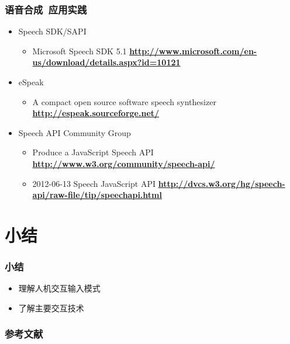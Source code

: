 \documentclass{beamer}
\newcommand{\fullPageImage}[2]{
	{
		\usebackgroundtemplate{\texttt{[image: \#1]}}
		\frame[plain]{#2}
	}
}
\begin{document}
\begin{frame}
	\frametitle{语音合成~{\small 应用实践}}
	\beamertemplatetransparentcovereddynamicmedium
	\begin{itemize}
		\item Speech SDK/SAPI
		\begin{itemize}
			\item Microsoft Speech SDK 5.1 \textbf{\url{http://www.microsoft.com/en-us/download/details.aspx?id=10121}}
		\end{itemize}
		\pause
		\item eSpeak
		\begin{itemize}
			\item A compact open source software speech synthesizer \textbf{\url{http://espeak.sourceforge.net/}}
		\end{itemize}
		\pause
		\item Speech API Community Group
		\begin{itemize}
			\item Produce a JavaScript Speech API \textbf{\url{http://www.w3.org/community/speech-api/}}
			\item 2012-06-13 Speech JavaScript API \textbf{\url{http://dvcs.w3.org/hg/speech-api/raw-file/tip/speechapi.html}}
		\end{itemize}
	\end{itemize}
\end{frame}

\fullPageImage{images/linux-espeak.jpg}{\transwipe}

%

\section{小结}
\begin{frame}
	\frametitle{小结}
	\begin{itemize}
		\item 理解人机交互输入模式
		\item 了解主要交互技术
	\end{itemize}
\end{frame}
 
\begin{frame}
	\frametitle{参考文献}
	
	
\end{frame}
\end{document}
